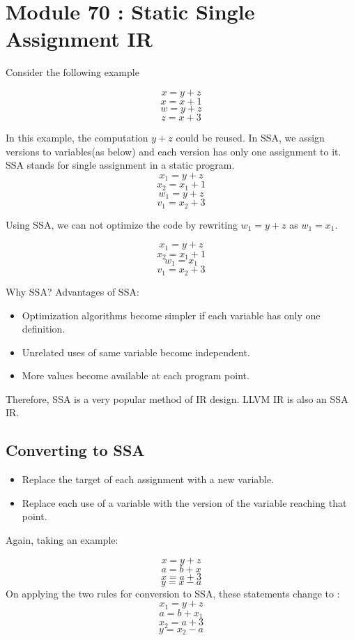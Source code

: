\section{Module 70 : Static Single Assignment IR}
Consider the following example

    \[x = y+z\]
    \[x = x+1\]
    \[w=y+z\]
    \[z=x+3\]
    
In this example, the computation $y+z$ could be reused.
In SSA, we assign versions to variables(as below) and each version has only one assignment to it. SSA stands for single assignment in a static program. 
    \[x_1 = y+z\]
    \[x_2 = x_1+1\]
    \[w_1=y+z\]
    \[v_1=x_2+3\]
    
Using SSA, we can not optimize the code by rewriting $w_1 = y+z$ as $w_1 = x_1$.

    \[x_1 = y+z\]
    \[x_2 = x_1+1\]
    \[w_1=x_1\]
    \[v_1=x_2+3\]
    
Why SSA? Advantages of SSA:
\begin{itemize}
    \item Optimization algorithms become simpler if each variable has only one definition.
    \item Unrelated uses of same variable become independent.
    \item More values become available at each program point.
\end{itemize}
Therefore, SSA is a very popular method of IR design. LLVM IR is also an SSA IR.

\subsection{Converting to SSA}
\begin{itemize}
    \item Replace the target of each assignment with a new variable.
    \item Replace each use of a variable with the version of the variable reaching that point.
\end{itemize}
Again, taking an example:

    \[x = y+z\]
    \[a = b+x\]
    \[x=a+3\]
    \[y=x-a\]
On applying the two rules for conversion to SSA, these statements change to :
     \[x_1 = y+z\]
    \[a = b+x_1\]
    \[x_2=a+3\]
    \[y=x_2-a\]
    

